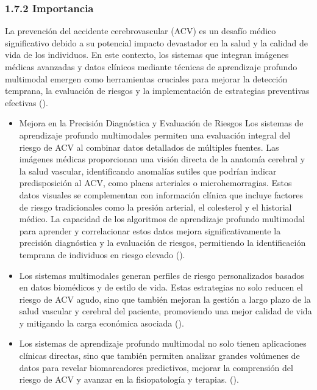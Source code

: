 \subsubsection{1.7.2 Importancia}

La prevención del accidente cerebrovascular (ACV) es un desafío médico significativo debido a su potencial impacto devastador en la salud y la calidad de vida de los individuos. En este contexto, los sistemas  que integran imágenes médicas avanzadas y datos clínicos mediante técnicas de aprendizaje profundo multimodal emergen como herramientas cruciales para mejorar la detección temprana, la evaluación de riesgos y la implementación de estrategias preventivas efectivas (\cite{esteva2019guide, litjens2017survey}).

\begin{itemize}
\item Mejora en la Precisión Diagnóstica y Evaluación de Riesgos
Los sistemas de aprendizaje profundo multimodales permiten una evaluación integral del riesgo de ACV al combinar datos detallados de múltiples fuentes. Las imágenes médicas proporcionan una visión directa de la anatomía cerebral y la salud vascular, identificando anomalías sutiles que podrían indicar predisposición al ACV, como placas arteriales o microhemorragias. Estos datos visuales se complementan con información clínica que incluye factores de riesgo tradicionales como la presión arterial, el colesterol y el historial médico. La capacidad de los algoritmos de aprendizaje profundo multimodal para aprender y correlacionar estos datos mejora significativamente la precisión diagnóstica y la evaluación de riesgos, permitiendo la identificación temprana de individuos en riesgo elevado (\cite{esteva2019guide, litjens2017survey}).


\item Los sistemas multimodales generan perfiles de riesgo personalizados basados en datos biomédicos y de estilo de vida. Estas estrategias no solo reducen el riesgo de ACV agudo, sino que también mejoran la gestión a largo plazo de la salud vascular y cerebral del paciente, promoviendo una mejor calidad de vida y mitigando la carga económica asociada (\cite{esteva2019guide, litjens2017survey}).


\item Los sistemas de aprendizaje profundo multimodal no solo tienen aplicaciones clínicas directas, sino que también permiten analizar grandes volúmenes de datos para revelar biomarcadores predictivos, mejorar la comprensión del riesgo de ACV y avanzar en la fisiopatología y terapias.
(\cite{esteva2019guide, litjens2017survey}).
\end{itemize}

